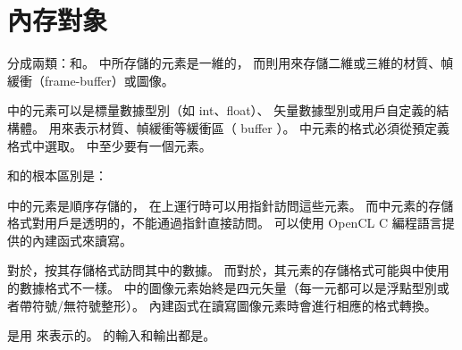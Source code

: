 \section{內存對象}

分成兩類：和。
中所存儲的元素是一維的，
而則用來存儲二維或三維的材質、幀緩衝（frame-buffer）或圖像。

中的元素可以是標量數據型別（如 int、float）、
矢量數據型別或用戶自定義的結構體。
用來表示材質、幀緩衝等緩衝區（ buffer ）。
中元素的格式必須從預定義格式中選取。
中至少要有一個元素。

和的根本區別是：
\startigBase
\item {}中的元素是順序存儲的，
在上運行時可以用指針訪問這些元素。
而中元素的存儲格式對用戶是透明的，不能通過指針直接訪問。
可以使用 OpenCL C 編程語言提供的內建函式來讀寫。

\item 對於，按其存儲格式訪問其中的數據。
而對於，其元素的存儲格式可能與中使用的數據格式不一樣。
中的圖像元素始終是四元矢量（每一元都可以是浮點型別或者帶符號/無符號整形）。
內建函式在讀寫圖像元素時會進行相應的格式轉換。
\stopigBase

是用  來表示的。
的輸入和輸出都是。

